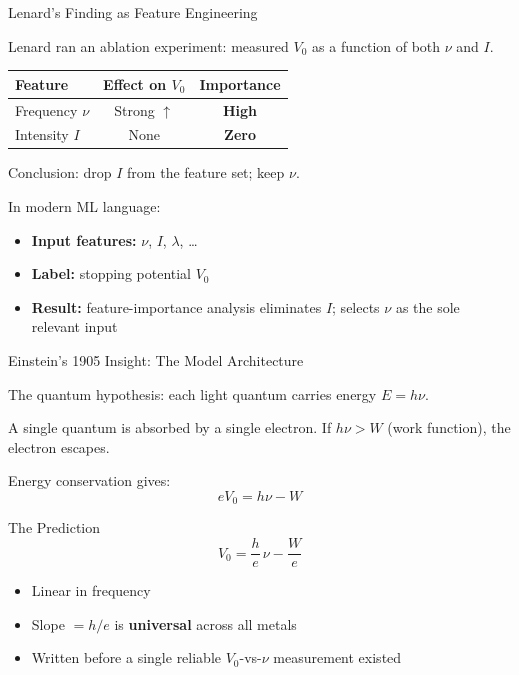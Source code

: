 \documentclass[aspectratio=169]{beamer}
\begin{document}
\begin{frame}{Lenard's Finding as Feature Engineering}

Lenard ran an ablation experiment: measured $V_0$ as a function of
both $\nu$ and $I$.

\medskip
\begin{center}
\begin{tabular}{lcc}
\toprule
Feature & Effect on $V_0$ & Importance \\
\midrule
Frequency $\nu$ & Strong $\uparrow$ & \textbf{High} \\
Intensity $I$  & None             & \textbf{Zero} \\
\bottomrule
\end{tabular}
\end{center}

\medskip
Conclusion: drop $I$ from the feature set; keep $\nu$.

\bigskip
In modern ML language:
\begin{itemize}
  \item \textbf{Input features:} $\nu$, $I$, $\lambda$, \ldots
  \item \textbf{Label:} stopping potential $V_0$
  \item \textbf{Result:} feature-importance analysis eliminates $I$;
    selects $\nu$ as the sole relevant input
\end{itemize}

\end{frame}

\begin{frame}{Einstein's 1905 Insight: The Model Architecture}

The quantum hypothesis: each light quantum carries energy $E = h\nu$.

\medskip
A single quantum is absorbed by a single electron.
If $h\nu > W$ (work function), the electron escapes.

\medskip
Energy conservation gives:
\[
  eV_0 = h\nu - W
\]

\medskip
\begin{block}{The Prediction}
\[
  V_0 = \frac{h}{e}\,\nu - \frac{W}{e}
\]
\begin{itemize}
  \item Linear in frequency
  \item Slope $= h/e$ is \textbf{universal} across all metals
  \item Written before a single reliable $V_0$-vs-$\nu$ measurement existed
\end{itemize}
\end{block}

\end{frame}
\end{document}
